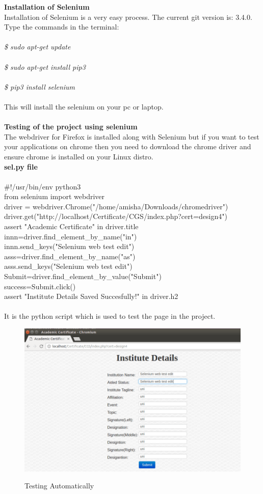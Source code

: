 \textbf{Installation of Selenium}\\
Installation of Selenium is a very easy process.
The current git version is: 3.4.0.
Type the commands in the terminal:\\\\
\emph{
\$ sudo apt-get update\\\\
\$ sudo apt-get install pip3\\\\
\$ pip3 install selenium\\\\}
This will install the selenium on your pc or laptop.\\\\
\textbf{Testing of the project using selenium}\\
The webdriver for Firefox is installed along with Selenium but if you want to test your applications on chrome then you need to download the chrome driver and ensure chrome is installed on your Linux distro.\\
\textbf{sel.py file}\\\\
\#!/usr/bin/env python3\\
from selenium import webdriver\\
driver = webdriver.Chrome("/home/amisha/Downloads/chromedriver")\\
driver.get("http://localhost/Certificate/CGS/index.php?cert=design4")\\
assert "Academic Certificate" in driver.title\\
innn=driver.find\_element\_by\_name("in")\\
innn.send\_keys("Selenium web test edit")\\
asss=driver.find\_element\_by\_name("as")\\
asss.send\_keys("Selenium web test edit")\\
Submit=driver.find\_element\_by\_value("Submit")\\
success=Submit.click()\\
assert "Institute Details Saved Succesfully!" in driver.h2\\\\
It is the python script which is used to test the page in the project.
\begin{figure}[!ht]
\centering
\includegraphics[width=0.8\linewidth]{input/images/se3.png}
\label{fig:image1}
\caption{Testing Automatically}
\end{figure}
